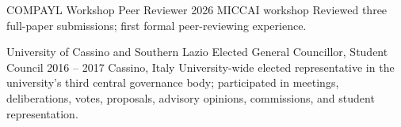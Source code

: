 
\begin{cventries}
\cventry
  {COMPAYL Workshop}
  {Peer Reviewer}
  {2026}
  {MICCAI workshop}
  {Reviewed three full-paper submissions; first formal peer-reviewing experience.}

\cventry
  {University of Cassino and Southern Lazio}
  {Elected General Councillor, Student Council}
  {2016 -- 2017}
  {Cassino, Italy}
  {University-wide elected representative in the university's third central governance body; participated in meetings, deliberations, votes, proposals, advisory opinions, commissions, and student representation.}
\end{cventries}
